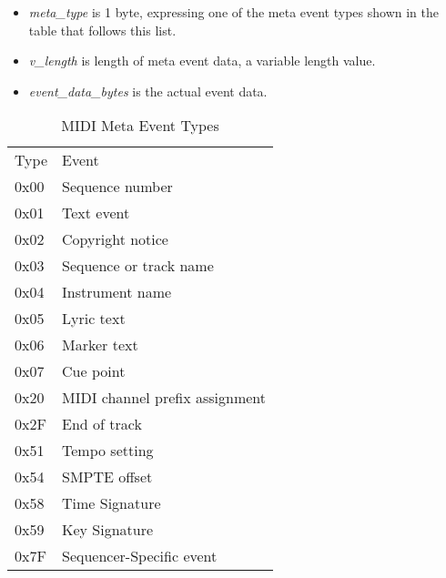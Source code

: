    \begin{itemize}
      \item \textsl{meta\_type} is 1 byte, expressing one of the meta event
         types shown in the table that follows this list.
      \item \textsl{v\_length} is length of meta event data, a variable
         length value.
      \item \textsl{event\_data\_bytes} is the actual event data.
   \end{itemize}

   \begin{table}
      \centering
      \caption{MIDI Meta Event Types}
      \label{table:midi_meta_event_types}
      \begin{tabular}{l l}
         Type & Event \\
         0x00 & Sequence number \\
         0x01 & Text event \\
         0x02 & Copyright notice \\
         0x03 & Sequence or track name \\
         0x04 & Instrument name \\
         0x05 & Lyric text \\
         0x06 & Marker text \\
         0x07 & Cue point \\
         0x20 & MIDI channel prefix assignment \\
         0x2F & End of track \\
         0x51 & Tempo setting \\
         0x54 & SMPTE offset \\
         0x58 & Time Signature \\
         0x59 & Key Signature \\
         0x7F & Sequencer-Specific event \\
      \end{tabular}
   \end{table}

